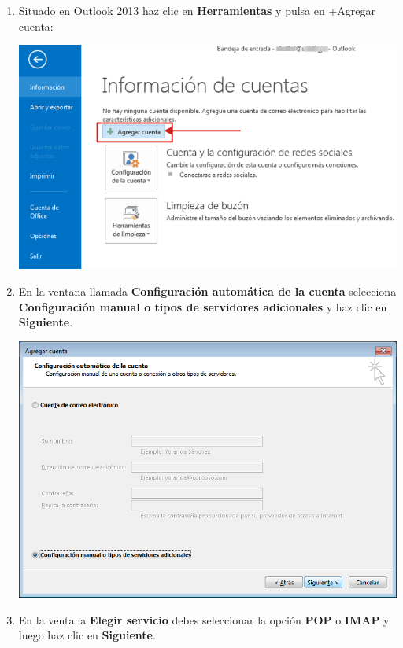 		\begin{enumerate}
			\item Situado en Outlook 2013 haz clic en \textbf{Herramientas} y pulsa en +Agregar cuenta:
			
			\begin{center}
				\includegraphics[scale=0.4]{image/outlook1.png}
			\end{center}
			
			\newpage
			
			\item En la ventana llamada \textbf{Configuración automática de la cuenta} selecciona \textbf{Configuración manual o tipos de servidores adicionales} y haz clic en \textbf{Siguiente}.
			
			\begin{center}
				\includegraphics[scale=0.6]{image/outlook2.png}
			\end{center}
			
			\item En la ventana \textbf{Elegir servicio} debes seleccionar la opción \textbf{POP} o \textbf{IMAP} y luego haz clic en \textbf{Siguiente}.
			

\end{enumerate}
